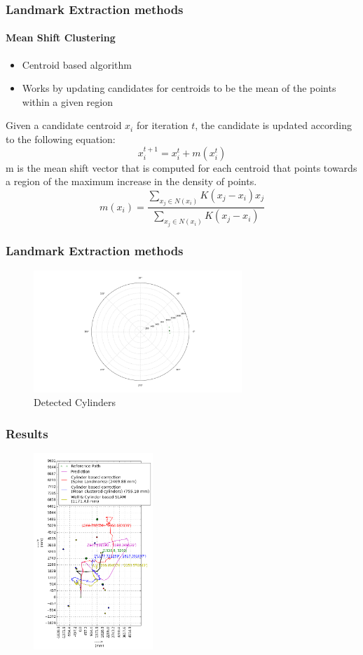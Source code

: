 \documentclass{beamer}
\begin{document}
		\begin{frame}
			\frametitle{Landmark Extraction methods}
			\framesubtitle{Mean Shift Clustering}
			\begin{itemize}
				\item Centroid based algorithm
				\item  Works by updating candidates for centroids to be the mean of the points within a given region
			\end{itemize}
			Given a candidate centroid $x_i$ for iteration $t$, the candidate is updated according to the following equation:
			\begin{equation*}
				x_i^{t+1}=x_i^t+m(x_i^t)
			\end{equation*}
			m is the mean shift vector that is computed for each centroid that points towards a region of the maximum increase in the density of points.
			\begin{equation*}
				m(x_i)=\frac{\sum_{x_j \in N(x_i)}K(x_j-x_i)x_j}{\sum_{x_j \in N(x_i)}K(x_j-x_i)}
			\end{equation*}
		\end{frame}
		
		\begin{frame}
			\frametitle{Landmark Extraction methods}
			\begin{figure}
				\includegraphics[width=0.7\textwidth,height=0.7\textheight]{4Cyl}
				\caption{Detected Cylinders}
			\end{figure}
		\end{frame}
		
		\begin{frame}
			\frametitle{Results}
			\begin{figure}
				\includegraphics[width=0.4\textwidth,height=0.7\textheight]{overlayResult}
			\end{figure}
		\end{frame}
		
\end{document}
